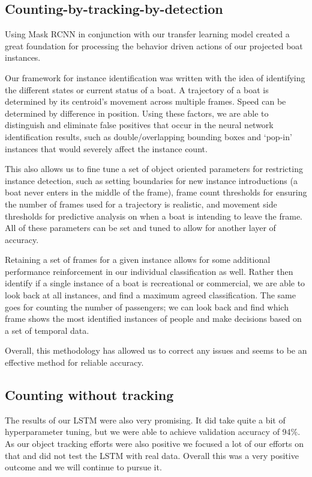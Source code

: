 \documentclass[10pt,twocolumn,letterpaper]{article}
\begin{document}
\subsection{Counting-by-tracking-by-detection}

Using Mask RCNN in conjunction with our transfer learning model created a great foundation for processing the behavior driven actions of our projected boat instances.  

Our framework for instance identification was written with the idea of identifying the different states or current status of a boat.  A trajectory of a boat is determined by its centroid's movement across multiple frames.  Speed can be determined by difference in position.  Using these factors, we are able to distinguish and eliminate false positives that occur in the neural network identification results, such as double/overlapping bounding boxes and `pop-in' instances that would severely affect the instance count.

This also allows us to fine tune a set of object oriented parameters for restricting instance detection, such as setting boundaries for new instance introductions (a boat never enters in the middle of the frame), frame count thresholds for ensuring the number of frames used for a trajectory is realistic, and movement side thresholds for predictive analysis on when a boat is intending to leave the frame.  All of these parameters can be set and tuned to allow for another layer of accuracy.

Retaining a set of frames for a given instance allows for some additional performance reinforcement in our individual classification as well.  Rather then identify if a single instance of a boat is recreational or commercial, we are able to look back at all instances, and find a maximum agreed classification.  The same goes for counting the number of passengers; we can look back and find which frame shows the most identified instances of people and make decisions based on a set of temporal data.

Overall, this methodology has allowed us to correct any issues and seems to be an effective method for reliable accuracy.

\subsection{Counting without tracking}

The results of our LSTM were also very promising. It did take quite a bit of hyperparameter tuning, but we were able to achieve validation accuracy of 94\%. As our object tracking efforts were also positive we focused a lot of our efforts on that and did not test the LSTM with real data. Overall this was a very positive outcome and we will continue to pursue it.
\end{document}
